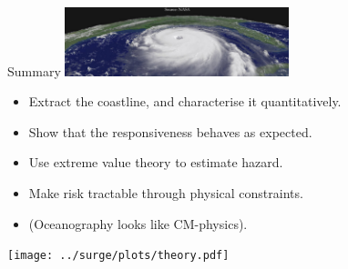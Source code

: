 \begin{frame}{Summary}
\centering
\includegraphics[height=2cm]{images/NASA-KATRINA-SIDEON.jpg}
\begin{itemize}
\item Extract the coastline, and characterise it quantitatively.
\item Show that the responsiveness behaves as expected.
\item Use extreme value theory to estimate hazard.
\item Make risk tractable through physical constraints.
\item (Oceanography looks like CM-physics).
\end{itemize}
\centering
\texttt{[image: ../surge/plots/theory.pdf]}

\end{frame}
